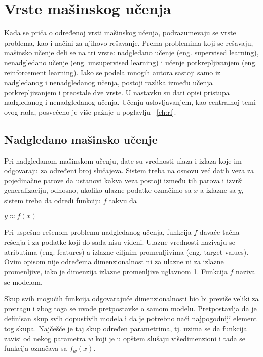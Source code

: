 \section{Vrste mašinskog učenja}

Kada se priča o određenoj vrsti mašinskog učenja, podrazumevaju se vrste problema, kao i načini za njihovo rešavanje. Prema problemima koji se rešavaju, mašinsko učenje deli se na tri vrste: nadgledano učenje (eng. supervised learning), nenadgledano učenje (eng. unsupervised learning) i učenje potkrepljivanjem (eng. reinforcement learning). Iako se podela mnogih autora sastoji samo iz nadgledanog i nenadgledanog učenja, postoji razlika između učenja potkrepljivanjem i preostale dve vrste. U nastavku su dati opisi pristupa nadgledanog i nenadgledanog učenja. Učenju uslovljavanjem, kao centralnoj temi ovog rada, posvećeno je više pažnje u poglavlju~ \ref{ch:rl}. 

\subsection{Nadgledano mašinsko učenje}

Pri nadgledanom mašinskom učenju, date su vrednosti ulaza i izlaza koje im odgovaraju za određeni broj slučajeva. Sistem treba na osnovu već datih veza za pojedinačne parove da ustanovi kakva veza postoji između tih parova i izvrši generalizaciju, odnosno, ukoliko ulazne podatke označimo sa $x$ a izlazne sa $y$, sistem treba da odredi funkciju $f$ takvu da 
\begin{center}
	$y \approx f(x)$
\end{center}
Pri uspešno rešenom problemu nadgledanog učenja, funkcija $f$ davaće tačna rešenja i za podatke koji do sada nisu viđeni.
Ulazne vrednosti nazivaju se atributima (eng. features) a izlazne ciljnim promenljivima (eng. target values). Ovim opisom nije određema dimenzionalnost ni za ulazne ni za izlazne promenljive, iako je dimenzija izlazne promenljive uglavnom 1. Funkcija $f$ naziva se modelom. \par
Skup svih mogućih funkcija odgovarajuće dimenzionalnosti bio bi previše veliki za pretragu i zbog toga se uvode pretpostavke o samom modelu. Pretpostavlja da je definisan skup svih dopustivih modela i da je potrebno naći najpogodniji element tog skupa. Najčešće je taj skup određen parametrima, tj. uzima se da funkcija zavisi od nekog parametra $w$ koji je u opštem slušaju višedimenzioni i tada se funkcija označava sa $f_w(x)$.


